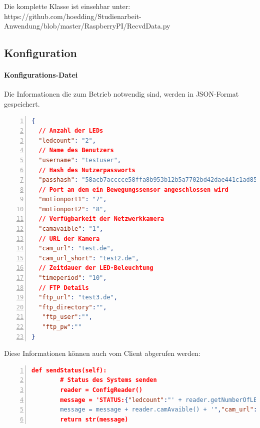 Die komplette Klasse ist einsehbar unter: https://github.com/hoedding/Studienarbeit-Anwendung/blob/master/RaspberryPI/RecvdData.py

\subsection{Konfiguration}
\paragraph{Konfigurations-Datei}
Die Informationen die zum Betrieb notwendig sind, werden in JSON-Format gespeichert.
\begin{lstlisting}[caption=Konfigurationsdatei config.json, language=json, frame=single, breaklines=true,columns=fullflexible, commentstyle=\color{gray}\upshape, captionpos=b, numbers = left]
{
  // Anzahl der LEDs
  "ledcount": "2",
  // Name des Benutzers
  "username": "testuser",
  // Hash des Nutzerpassworts
  "passhash": "58acb7acccce58ffa8b953b12b5a7702bd42dae441c1ad85057fa70b",
  // Port an dem ein Bewegungssensor angeschlossen wird
  "motionport1": "7",
  "motionport2": "8",
  // Verfügbarkeit der Netzwerkkamera
  "camavaible": "1",
  // URL der Kamera
  "cam_url": "test.de",
  "cam_url_short": "test2.de",
  // Zeitdauer der LED-Beleuchtung
  "timeperiod": "10",
  // FTP Details
  "ftp_url": "test3.de",
  "ftp_directory":"", 
   "ftp_user":"", 
   "ftp_pw":""
}
\end{lstlisting}
Diese Informationen können auch vom Client abgerufen werden: 
\begin{lstlisting}[caption=Senden von Konfigurationsinformationen an den Client, language=json, frame=single, breaklines=true,columns=fullflexible, commentstyle=\color{gray}\upshape, captionpos=b, numbers = left]
    def sendStatus(self):
        # Status des Systems senden
        reader = ConfigReader()
        message = 'STATUS:{"ledcount":"' + reader.getNumberOfLED() + '","motionport1":"' + reader.getMotionPin1() + '","motionport2":"' + reader.getMotionPin2() + '","ftp_url":"' + reader.getFTP() + '","camavaible":"'
        message = message + reader.camAvaible() + '","cam_url":"' + reader.camURL() + '","cam_url_short":"' + reader.camShortURL() + '","timeperiod":"' + reader.getTimePeriod() + '"}'
        return str(message)
\end{lstlisting}

